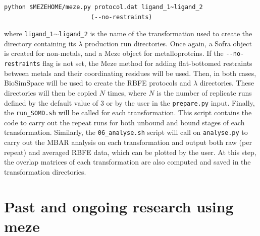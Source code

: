 \begin{tcolorbox}[title=Heating meze:,breakable, colframe=myframecolour]
\begin{verbatim}
python $MEZEHOME/meze.py protocol.dat ligand_1~ligand_2 
                        (--no-restraints)
\end{verbatim}
\end{tcolorbox}
\noindent where \texttt{ligand\_1$\sim$ligand\_2} is the name of the transformation used to create the directory containing its $\lambda$ production run directories. Once again, a Sofra object is created for non-metals, and a Meze object for metalloproteins. If the \texttt{{-}{-}no-restraints} flag is not set, the Meze method for adding flat-bottomed restraints between metals and their coordinating residues will be used. Then, in both cases, BioSimSpace will be used to create the RBFE protocols and $\lambda$ directories. These directories will then be copied $N$ times, where $N$ is the number of replicate runs defined by the default value of 3 or by the user in the \texttt{prepare.py} input. Finally, the \texttt{run\_SOMD.sh} will be called for each transformation. This script contains the code to carry out the repeat runs for both unbound and bound stages of each transformation. Similarly, the \texttt{06\_analyse.sh} script will call on \texttt{analyse.py} to carry out the MBAR analysis on each transformation and output both raw (per repeat) and averaged RBFE data, which can be plotted by the user. At this step, the overlap matrices of each transformation are also computed and saved in the transformation directories. 

\section{Past and ongoing research using meze}

